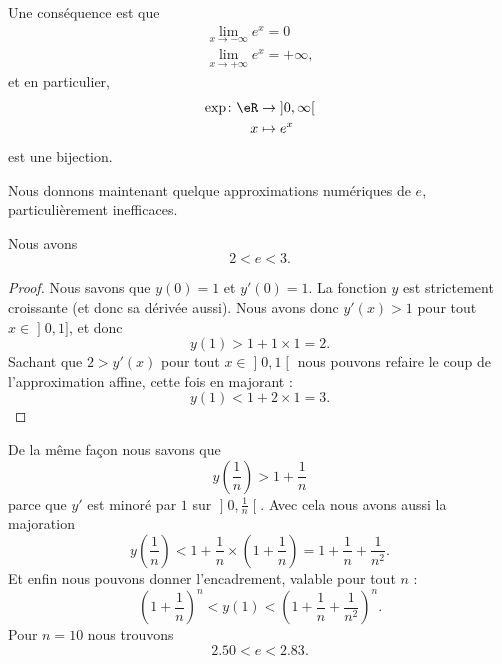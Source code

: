 Une conséquence est que 
\begin{subequations}    \label{EqLOIUooHxnEDn}
    \begin{align}
        \lim_{x\to -\infty}  e^{x}=0\\
        \lim_{x\to +\infty}  e^{x}=+\infty,
    \end{align}
\end{subequations}
et en particulier, 
\begin{equation}
    \begin{aligned}
    \exp\colon \eR&\to \mathopen] 0 , \infty \mathclose[ \\
        x&\mapsto  e^{x} 
    \end{aligned}
\end{equation}
est une bijection.

Nous donnons maintenant quelque approximations numériques de \( e\), particulièrement inefficaces.

\begin{lemma}
    Nous avons
    \begin{equation}
        2<e<3.
    \end{equation}
\end{lemma}

\begin{proof}
    Nous savons que \( y(0)=1\) et \( y'(0)=1\). La fonction \( y\) est strictement croissante (et donc sa dérivée aussi). Nous avons donc \( y'(x)>1\) pour tout \( x\in\mathopen] 0 , 1 \mathclose]\), et donc
    \begin{equation}
        y(1)>1+1\times 1=2.
    \end{equation}
    Sachant que \( 2>y'(x)\) pour tout \( x\in \mathopen] 0 , 1 \mathclose[\) nous pouvons refaire le coup de l'approximation affine, cette fois en majorant :
        \begin{equation}
            y(1)<1+2\times 1=3.
        \end{equation}
\end{proof}

De la même façon nous savons que
\begin{equation}
    y(\frac{1}{ n })>1+\frac{1}{ n }
\end{equation}
parce que \( y'\) est minoré par \( 1\) sur \( \mathopen] 0 , \frac{1}{ n } \mathclose[\). Avec cela nous avons aussi la majoration
\begin{equation}
    y(\frac{1}{ n })<1+\frac{1}{ n }\times \left( 1+\frac{1}{ n } \right)=1+\frac{1}{ n }+\frac{1}{ n^2 }.
\end{equation}
Et enfin nous pouvons donner l'encadrement, valable pour tout \( n\) :
\begin{equation}
    \left( 1+\frac{1}{ n } \right)^n<y(1)<\left( 1+\frac{1}{ n }+\frac{1}{ n^2 } \right)^n.
\end{equation}
Pour \( n=10\) nous trouvons
\begin{equation}
    2.50<e<2.83.
\end{equation}

